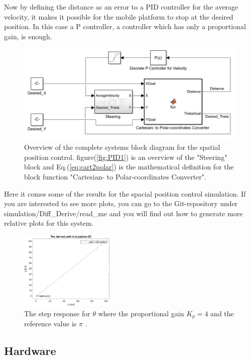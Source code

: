 Now by defining the distance as an error to a PID controller for the average velocity, it makes it possible for the mobile platform to stop at the desired position. 
In this case a P controller, a controller which has only a proportional gain, is enough.\\
\begin{figure}[ht]
\centering
\includegraphics[width=\textwidth]{sections/assets/V_PID.PNG}
\caption{Overview of the complete systems block diagram for the spatial position control. figure(\ref{fig:PID1}) is an overview of the "Steering" block and Eq.(\ref{eq:cart2polar}) is the mathematical definition for the block function "Cartesian- to Polar-coordinates Converter".}
\label{fig:V_PID}
\end{figure} 
Here it comes some of the results for the spacial position control simulation. If you are interested to see more plots, you can go to the Git-repository under simulation/Diff_Derive/read_me and you will find out how to generate more relative plots for this system.
\begin{figure}[ht]
\centering
\includegraphics[width=0.4\textwidth]{sections/assets/traj.png}
\caption{The step response for $\theta$ where the proportional gain $K_p = 4$ and the reference value is $\pi$ .}
\label{fig:Theta_Step}
\end{figure}


\subsection{Hardware}

